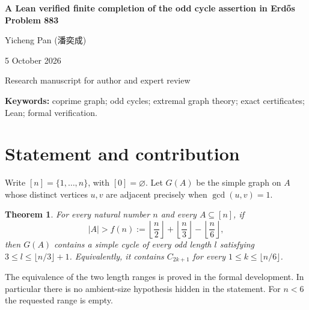 \documentclass[11pt,letterpaper]{article}
\numberwithin{equation}{section}
\newtheorem{theorem}{Theorem}
\begin{document}
\thispagestyle{plain}
\begin{center}
{\LARGE\bfseries A Lean verified finite completion of the odd cycle assertion in Erdős Problem 883\par}
\vspace{10pt}
{\large Yicheng Pan ({\chinesefont 潘奕成})\par}
\vspace{5pt}
{5 October 2026\par}
{\small Research manuscript for author and expert review\par}
\end{center}
\begin{abstract}
For every natural number $n$, a subset of $\{1,\ldots,n\}$ with more than
$\lfloor n/2\rfloor+\lfloor n/3\rfloor-\lfloor n/6\rfloor$ elements has a coprime graph containing every odd cycle of length $2k+1$, $1\le k\le\lfloor n/6\rfloor$.
We describe a Lean 4 proof of this assertion, the first question of Erdős Problem 883. The argument adapts Della Pietra's surplus smoothing, totient profiles, signature ordering and ordered-Hall architecture. An exact all-subsets interval criterion, checked arithmetic certificates and an analytic theorem for $n\ge200000$ remove the unspecified starting threshold. An elementary odd-triple argument supplies the coprime endpoints. The formal conclusion is checked against the unabbreviated canonical statement with no additional hypotheses. This paper explains the proof and identifies its certificate interfaces; the accompanying frozen Lean source is the authoritative formal artifact. Neither external human review nor a second clean rebuild of every numerical certificate is claimed.
\end{abstract}
\textbf{Keywords:} coprime graph; odd cycles; extremal graph theory; exact certificates; Lean; formal verification.

\section{Statement and contribution}\label{sec:main}
Write $[n]=\{1,\ldots,n\}$, with $[0]=\varnothing$. Let $G(A)$ be the simple graph on $A$ whose distinct vertices $u,v$ are adjacent precisely when $\gcd(u,v)=1$.
\begin{theorem}\label{thm:main}
For every natural number $n$ and every $A\subseteq[n]$, if
\[
 |A|>f(n):=\left\lfloor\frac n2\right\rfloor+
 \left\lfloor\frac n3\right\rfloor-\left\lfloor\frac n6\right\rfloor,
\]
then $G(A)$ contains a simple cycle of every odd length $l$ satisfying
$3\le l\le\lfloor n/3\rfloor+1$.
Equivalently, it contains $C_{2k+1}$ for every $1\le k\le\lfloor n/6\rfloor$.
\end{theorem}
The equivalence of the two length ranges is proved in the formal development. In particular there is no ambient-size hypothesis hidden in the statement. For $n<6$ the requested range is empty.
\end{document}
